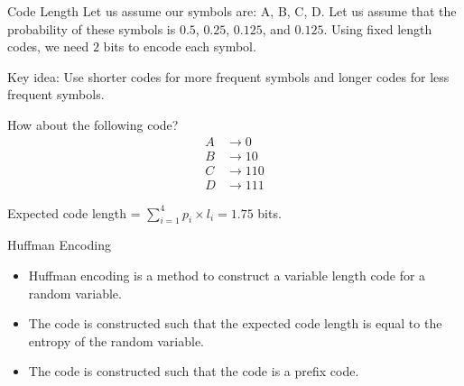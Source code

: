 \documentclass[handout]{beamer}
\begin{document}
    \begin{frame}{Code Length}
        Let us assume our symbols are: A, B, C, D. Let us assume that the probability of these symbols is $0.5$, $0.25$, $0.125$, and $0.125$. 
        Using fixed length codes, we need $2$ bits to encode each symbol.

        Key idea: Use shorter codes for more frequent symbols and longer codes for less frequent symbols.

        How about the following code?
        \begin{align*}
            A &\rightarrow 0 \\
            B &\rightarrow 10 \\
            C &\rightarrow 110 \\
            D &\rightarrow 111
        \end{align*}

        Expected code length = $\sum_{i=1}^4 p_i \times l_i = 1.75$ bits.
        
    \end{frame}

    \begin{frame}{Huffman Encoding}
        \begin{itemize}
            \item Huffman encoding is a method to construct a variable length code for a random variable.
            \item The code is constructed such that the expected code length is equal to the entropy of the random variable.
            \item The code is constructed such that the code is a prefix code.
        \end{itemize}
        
    \end{frame}
\end{document}
